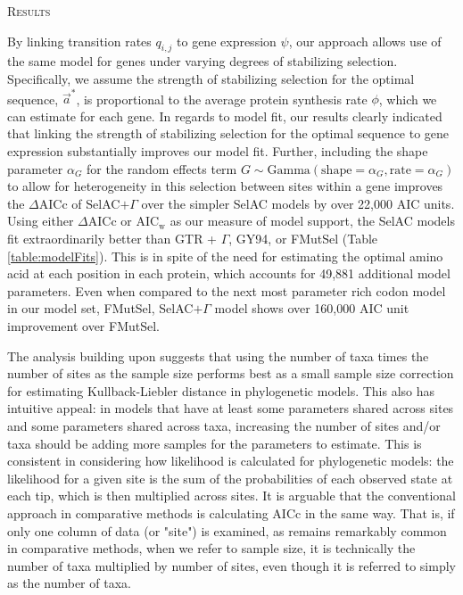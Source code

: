 \documentclass[12pt,letterpaper,fleqn]{article}
\renewcommand{\section}[1]{%
\bigskip
\begin{center}
\begin{Large}
\normalfont\scshape #1
\medskip
\end{Large}
\end{center}}
\newcommand{\DeltaAICc}{\ensuremath{\Delta\text{AICc}}\xspace}
\newcommand{\AICw}{\ensuremath{\text{AIC}_\text{w}}\xspace}
\newcommand{\selac}{SelAC\xspace}
\newcommand{\selacplusgamma}{SelAC$+\Gamma$\xspace}
\newcommand{\alphag}{\ensuremath{\alpha_G}\xspace}
\newcommand{\aoptvec}{\ensuremath{\Vec{a}^*}\xspace}
\newcommand{\qij}{\ensuremath{q_{i,j}}\xspace}
\begin{document}
\section{Results}
By linking transition rates $\qij$ to gene expression $\psi$, our approach allows use of the same model for genes under varying degrees of stabilizing selection.
Specifically, we assume the strength of stabilizing selection for the optimal sequence, \aoptvec, is proportional to the average protein synthesis rate $\phi$, which we can estimate for each gene.
In regards to model fit, our results clearly indicated that linking the strength of stabilizing selection for the optimal sequence to gene expression substantially improves our model fit.
Further, including the shape parameter \alphag for the random effects term $G \sim \text{Gamma}(\text{shape} = \alphag, \text{rate}=\alphag)$ to allow for heterogeneity in this selection between sites within a gene improves the \DeltaAICc of \selacplusgamma over the simpler \selac models by over 22,000 AIC units.
Using either \DeltaAICc or \AICw as our measure of model support, the \selac models fit extraordinarily better than GTR + $\Gamma$, GY94, or FMutSel (Table \ref{table:modelFits}).
This is in spite of the need for estimating the optimal amino acid at each position in each protein, which accounts for 49,881 additional model parameters.
Even when compared to the next most parameter rich codon model in our model set, FMutSel, \selacplusgamma model shows over 160,000 AIC unit improvement over FMutSel.

The analysis building upon \citet{Jhwuengetal2014}  suggests that using the number of taxa times the number of sites as the sample size performs best as a small sample size correction for estimating Kullback-Liebler distance in phylogenetic models. This also has intuitive appeal: in models that have at least some parameters shared across sites and some parameters shared across taxa, increasing the number of sites and/or taxa should be adding more samples for the parameters to estimate.
This is consistent in considering how likelihood is calculated for phylogenetic models: the likelihood for a given site is the sum of the probabilities of each observed state at each tip, which is then multiplied across sites.
It is arguable that the conventional approach in comparative methods is calculating AICc in the same way.
That is, if only one column of data (or "site") is examined, as remains remarkably common in comparative methods, when we refer to sample size, it is technically the number of taxa multiplied by number of sites, even though it is referred to simply as the number of taxa.
\end{document}
